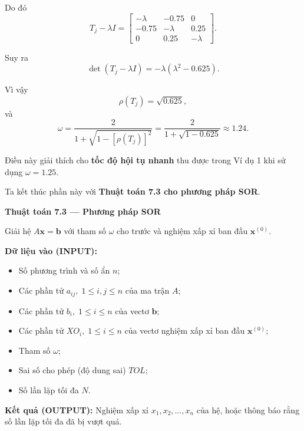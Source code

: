 Do đó
\[
T_j - \lambda I =
\begin{bmatrix}
-\lambda & -0.75 & 0 \\
-0.75 & -\lambda & 0.25 \\
0 & 0.25 & -\lambda
\end{bmatrix}.
\]

Suy ra
\[
\det(T_j - \lambda I) = -\lambda (\lambda^2 - 0.625).
\]

Vì vậy
\[
\rho(T_j) = \sqrt{0.625},
\]
và
\[
\omega = \frac{2}{1 + \sqrt{1 - [\rho(T_j)]^2}} 
= \frac{2}{1 + \sqrt{1 - 0.625}} 
\approx 1.24.
\]

Điều này giải thích cho \textbf{tốc độ hội tụ nhanh} thu được trong Ví dụ 1 
khi sử dụng \( \omega = 1.25 \).

Ta kết thúc phần này với \textbf{Thuật toán 7.3 cho phương pháp SOR}.

\textbf{Thuật toán 7.3 — Phương pháp SOR}

Giải hệ \( A\mathbf{x} = \mathbf{b} \) với tham số \( \omega \) cho trước và 
nghiệm xấp xỉ ban đầu \( \mathbf{x}^{(0)} \).

\textbf{Dữ liệu vào (INPUT):}
\begin{itemize}
\item Số phương trình và số ẩn \( n \);
\item Các phần tử \( a_{ij},\; 1 \le i,j \le n \) của ma trận \( A \);
\item Các phần tử \( b_i,\; 1 \le i \le n \) của vectơ \( \mathbf{b} \);
\item Các phần tử \( XO_i,\; 1 \le i \le n \) của vectơ nghiệm xấp xỉ ban đầu \( \mathbf{x}^{(0)} \);
\item Tham số \( \omega \);
\item Sai số cho phép (độ dung sai) \( TOL \);
\item Số lần lặp tối đa \( N \).
\end{itemize}

\textbf{Kết quả (OUTPUT):}  
Nghiệm xấp xỉ \( x_1, x_2, \ldots, x_n \) của hệ, hoặc thông báo rằng số lần lặp tối đa đã bị vượt quá.

